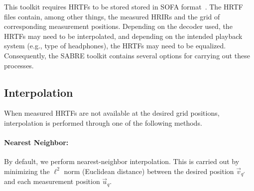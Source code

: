 This toolkit requires HRTFs to be stored stored in SOFA format~\citep{AES69-2015}.
The HRTF files contain, among other things, the measured HRIRs and the grid of corresponding measurement positions.
Depending on the decoder used, the HRTFs may need to be interpolated,
and depending on the intended playback system (e.g., type of headphones), the HRTFs may need to be equalized.
Consequently, the SABRE toolkit contains several options for carrying out these processes.

\subsection{Interpolation}
When measured HRTFs are not available at the desired grid positions, interpolation is performed through one of the following methods.

\paragraph*{Nearest Neighbor:} By default, we perform nearest-neighbor interpolation.
This is carried out by minimizing the $\ell^2$ norm (Euclidean distance) between the desired position
$\vec{v}_{q'}$ and each measurement position $\vec{u}_q$.

